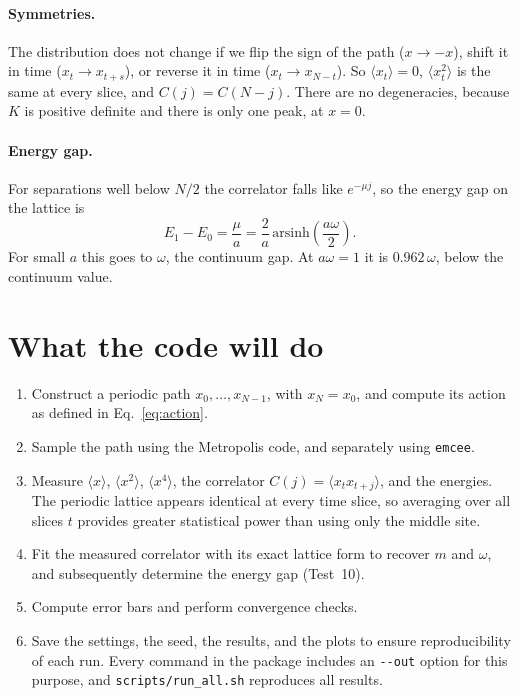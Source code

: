 \documentclass[11pt]{article}
\begin{document}
\paragraph{Symmetries.} The distribution does not change if we flip the sign of the path ($x \to -x$), shift it in time ($x_t \to x_{t+s}$), or reverse it in time ($x_t \to x_{N-t}$). So $\langle x_t\rangle = 0$, $\langle x_t^2\rangle$ is the same at every slice, and $C(j) = C(N-j)$. There are no degeneracies, because $K$ is positive definite and there is only one peak, at $x = 0$.

\paragraph{Energy gap.} For separations well below $N/2$ the correlator falls like $e^{-\mu j}$, so the energy gap on the lattice is
\begin{equation}
  E_1 - E_0 = \frac{\mu}{a} = \frac{2}{a}\,\mathrm{arsinh}\!\left(\frac{a\omega}{2}\right).
  \label{eq:gap}
\end{equation}
For small $a$ this goes to $\omega$, the continuum gap. At $a\omega = 1$ it is $0.962\,\omega$, below the continuum value.

\section{What the code will do}
\begin{enumerate}
  \item Construct a periodic path $x_0, \dots, x_{N-1}$, with $x_N = x_0$, and compute its action as defined in Eq.~\eqref{eq:action}.
  \item Sample the path using the Metropolis code, and separately using \texttt{emcee}.
  \item Measure $\langle x\rangle$, $\langle x^2\rangle$, $\langle x^4\rangle$, the correlator $C(j) = \langle x_t x_{t+j}\rangle$, and the energies. The periodic lattice appears identical at every time slice, so averaging over all slices $t$ provides greater statistical power than using only the middle site.
  \item Fit the measured correlator with its exact lattice form to recover $m$ and $\omega$, and subsequently determine the energy gap (Test~10).
  \item Compute error bars and perform convergence checks.
  \item Save the settings, the seed, the results, and the plots to ensure reproducibility of each run. Every command in the package includes an \texttt{-{}-out} option for this purpose, and \texttt{scripts/run\_all.sh} reproduces all results.
\end{enumerate}
\end{document}
